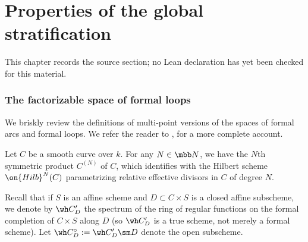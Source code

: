 \chapter{Properties of the global stratification}
\label{intersection-complexes-unramified-l-factors-chapter-10}

\begin{remark}
\label{intersection-complexes-unramified-l-factors-chapter-10-source}
This chapter records the source section; no Lean declaration has yet been checked for this material.
\notready
\end{remark}

\label{appendix:A}

\subsection{The factorizable space of formal loops} \label{sect:multijet}

We briskly review the definitions of multi-point versions of the
spaces of formal arcs and formal loops. We refer the reader to \cite{KV}, \cite[\S 3.1]{Xinwen} for a more complete account.

Let $C$ be a smooth curve over $k$.
For any $N \in \mbb N$, we have the $N$th symmetric product
$C^{(N)}$ of $C$, which identifies with the Hilbert scheme $\on{Hilb}^N(C)$
parametrizing relative effective divisors in $C$ of degree $N$.

Recall that if $S$ is an affine scheme and $D \subset C\times S$
is a closed affine subscheme, we denote by $\wh C'_D$ the
spectrum of the ring of regular functions
on the formal completion of $C\times S$ along $D$ (so $\wh C'_D$ is a true scheme, not merely a formal scheme).
Let $\wh C^\circ_D := \wh C'_D \sm D$ denote
the open subscheme.

